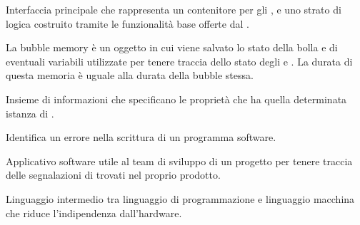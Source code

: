 Interfaccia principale che rappresenta un contenitore per gli ,  e uno strato di logica costruito tramite le funzionalità base offerte dal .

La bubble memory è un oggetto  in cui viene salvato lo stato della bolla e di eventuali variabili utilizzate per tenere traccia dello stato degli  e . La durata di questa memoria è uguale alla durata della bubble stessa.

Insieme di informazioni che specificano le proprietà  che ha quella determinata istanza di .

Identifica un errore nella scrittura di un programma software.

Applicativo software utile al team di sviluppo di un progetto per tenere traccia delle segnalazioni di  trovati nel proprio prodotto.
 
Linguaggio intermedio tra linguaggio di programmazione e linguaggio macchina che riduce l'indipendenza dall'hardware.
\clearpage
